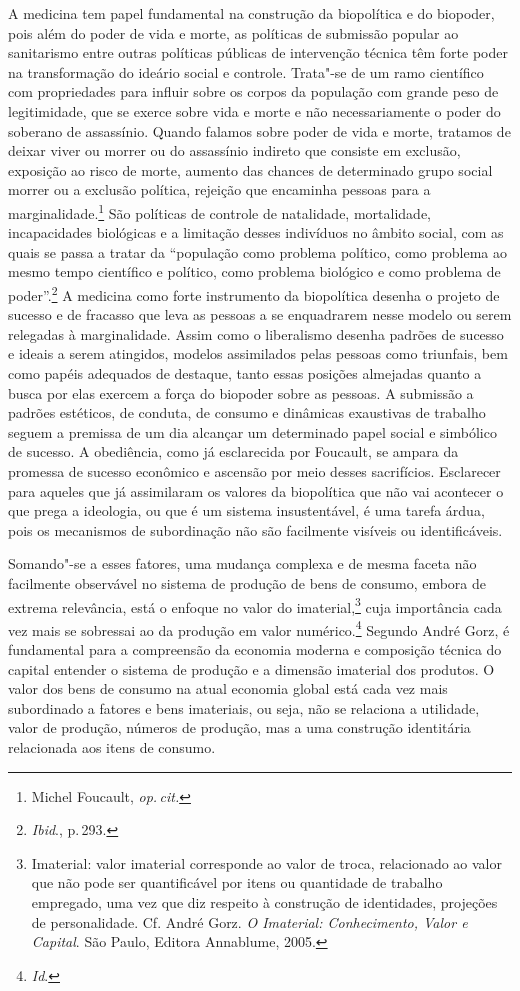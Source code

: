 A medicina tem papel fundamental na construção da biopolítica e do
biopoder, pois além do poder de vida e morte, as políticas de submissão
popular ao sanitarismo entre outras políticas públicas de intervenção
técnica têm forte poder na transformação do ideário social e controle.
Trata"-se de um ramo científico com propriedades para influir sobre os
corpos da população com grande peso de legitimidade, que se exerce sobre
vida e morte e não necessariamente o poder do soberano de assassínio.
Quando falamos sobre poder de vida e morte, tratamos de deixar viver ou
morrer ou do assassínio indireto que consiste em exclusão, exposição ao
risco de morte, aumento das chances de determinado grupo social morrer
ou a exclusão política, rejeição que encaminha pessoas para a
marginalidade.\footnote{Michel Foucault, \textit{op.\,cit.}} São políticas de controle de natalidade,
mortalidade, incapacidades biológicas e a limitação desses indivíduos no
âmbito social, com as quais se passa a tratar da ``população como
problema político, como problema ao mesmo tempo científico e político,
como problema biológico e como problema de poder''.\footnote{\textit{Ibid}., p.\,293.} A medicina como
forte instrumento da biopolítica desenha o projeto de sucesso e de
fracasso que leva as pessoas a se enquadrarem nesse modelo ou serem
relegadas à marginalidade. Assim como o liberalismo desenha padrões de
sucesso e ideais a serem atingidos, modelos assimilados pelas pessoas
como triunfais, bem como papéis adequados de destaque, tanto essas
posições almejadas quanto a busca por elas exercem a força do biopoder
sobre as pessoas. A submissão a padrões estéticos, de conduta, de
consumo e dinâmicas exaustivas de trabalho seguem a premissa de um dia
alcançar um determinado papel social e simbólico de sucesso. A
obediência, como já esclarecida por Foucault, se ampara da promessa
de sucesso econômico e ascensão por meio desses sacrifícios. Esclarecer
para aqueles que já assimilaram os valores da biopolítica que não vai
acontecer o que prega a ideologia, ou que é um sistema insustentável, é
uma tarefa árdua, pois os mecanismos de subordinação não são facilmente
visíveis ou identificáveis.

Somando"-se a esses fatores, uma mudança complexa e de mesma faceta não
facilmente observável no sistema de produção de bens de consumo, embora
de extrema relevância, está o enfoque no valor do imaterial,\footnote{Imaterial:
  valor imaterial corresponde ao valor de troca, relacionado ao valor
  que não pode ser quantificável por itens ou quantidade de trabalho
  empregado, uma vez que diz respeito à construção de identidades,
  projeções de personalidade. Cf. André Gorz. \textit{O Imaterial: Conhecimento, Valor e Capital}. São Paulo, Editora Annablume, 2005.} cuja importância cada vez
mais se sobressai ao da produção em valor numérico.\footnote{\textit{Id}.} Segundo
André Gorz, é fundamental para a compreensão da economia moderna e
composição técnica do capital entender o sistema de produção e a
dimensão imaterial dos produtos. O valor dos bens de consumo na atual
economia global está cada vez mais subordinado a fatores e bens
imateriais, ou seja, não se relaciona a utilidade, valor de produção,
números de produção, mas a uma construção identitária relacionada aos
itens de consumo.

